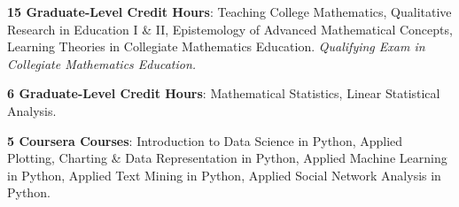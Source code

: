\documentclass[10pt,a4paper,sans]{moderncv}
\begin{document}
		{\textbf{15 Graduate-Level Credit Hours}: Teaching College Mathematics, Qualitative Research in Education I \& II, Epistemology of Advanced Mathematical Concepts, Learning Theories in Collegiate Mathematics Education. \textit{Qualifying Exam in Collegiate Mathematics Education.} }

		{\textbf{6 Graduate-Level Credit Hours}: Mathematical Statistics, Linear Statistical Analysis.}

		{\textbf{5 Coursera Courses}: Introduction to Data Science in Python, Applied Plotting, Charting \& Data Representation in Python, Applied Machine Learning in Python, Applied Text Mining in Python, Applied Social Network Analysis in Python.}
\end{document}
